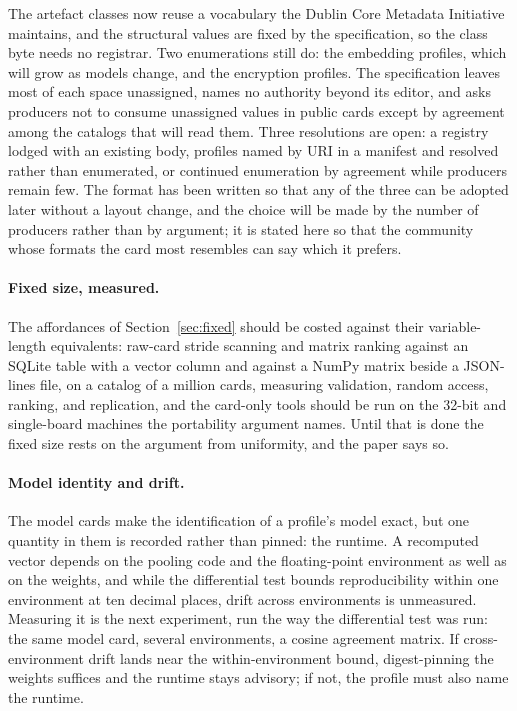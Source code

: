 \documentclass[11pt]{article}
\begin{document}
The artefact classes now reuse a vocabulary the Dublin Core Metadata
Initiative maintains, and the structural values are fixed by the
specification, so the class byte needs no registrar. Two enumerations still
do: the embedding profiles, which will grow as models change, and the
encryption profiles. The specification leaves most of each space unassigned,
names no authority beyond its editor, and asks producers not to consume
unassigned values in public cards except by agreement among the catalogs
that will read them. Three resolutions are open: a registry lodged with an
existing body, profiles named by URI in a manifest and resolved rather than
enumerated, or continued enumeration by agreement while producers remain
few. The format has been written so that any of the three can be adopted
later without a layout change, and the choice will be made by the number of
producers rather than by argument; it is stated here so that the community
whose formats the card most resembles can say which it prefers.

\paragraph{Fixed size, measured.} The affordances of
Section~\ref{sec:fixed} should be costed against their variable-length
equivalents: raw-card stride scanning and matrix ranking against an SQLite
table with a vector column and against a NumPy matrix beside a JSON-lines
file, on a catalog of a million cards, measuring validation, random access,
ranking, and replication, and the card-only tools should be run on the 32-bit
and single-board machines the portability argument names. Until that is done
the fixed size rests on the argument from uniformity, and the paper says so.

\paragraph{Model identity and drift.} The model cards make the identification
of a profile's model exact, but one quantity in them is recorded rather than
pinned: the runtime. A recomputed vector depends on the pooling code and the
floating-point environment as well as on the weights, and while the
differential test bounds reproducibility within one environment at ten
decimal places, drift across environments is unmeasured. Measuring it is the
next experiment, run the way the differential test was run: the same model
card, several environments, a cosine agreement matrix. If cross-environment
drift lands near the within-environment bound, digest-pinning the weights
suffices and the runtime stays advisory; if not, the profile must also name
the runtime.
\end{document}
